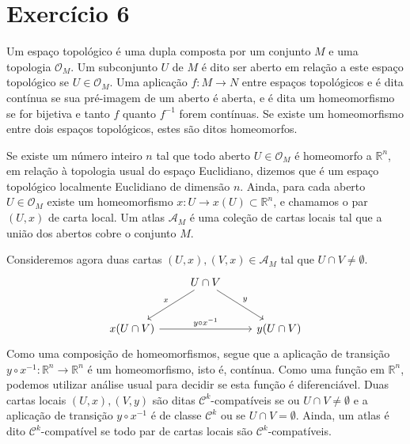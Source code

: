 \section*{Exercício 6}
Um espaço topológico é uma dupla  composta por um conjunto \(M\) e uma topologia \(\mathcal{O}_M\). Um subconjunto \(U\) de \(M\) é dito ser aberto em relação a este espaço topológico se \(U \in \mathcal{O}_M\). Uma aplicação \(f : M \to N\) entre espaços topológicos  e  é dita contínua se sua pré-imagem de um aberto é aberta, e é dita um homeomorfismo se for bijetiva e tanto \(f\) quanto \(f^{-1}\) forem contínuas. Se existe um homeomorfismo entre dois espaços topológicos, estes são ditos homeomorfos.

Se existe um número inteiro \(n\) tal que todo aberto \(U \in \mathcal{O}_M\) é homeomorfo a \(\mathbb{R}^n\), em relação à topologia usual do espaço Euclidiano, dizemos que  é um espaço topológico localmente Euclidiano de dimensão \(n\). Ainda, para cada aberto \(U \in \mathcal{O}_M\) existe um homeomorfismo \(x : U \to x(U) \subset \mathbb{R}^n\), e chamamos o par \((U,x)\) de carta local. Um atlas \(\mathscr{A}_M\) é uma coleção de cartas locais tal que a união dos abertos cobre o conjunto \(M\).

Consideremos agora duas cartas \((U, x), (V, x) \in \mathscr{A}_M\) tal que \(U \cap V \neq \emptyset\).
\begin{equation*}
    \begin{tikzcd}[column sep = normal, row sep = large]
        &\arrow[swap]{dl}{x} U \cap V\arrow{dr}{y}&\\
        x(U\cap V) \arrow{rr}{y \circ x^{-1}} & & y(U\cap V)
    \end{tikzcd}
\end{equation*}
Como uma composição de homeomorfismos, segue que a aplicação de transição \(y \circ x^{-1} : \mathbb{R}^n \to \mathbb{R}^n\) é um homeomorfismo, isto é, contínua. Como uma função em \(\mathbb{R}^n\), podemos utilizar análise usual para decidir se esta função é diferenciável. Duas cartas locais \((U, x), (V, y)\) são ditas \(\mathcal{C}^k\)-compatíveis se ou \(U \cap V \neq \emptyset\) e a aplicação de transição \(y \circ x^{-1}\) é de classe \(\mathcal{C}^k\) ou se \(U \cap V = \emptyset\). Ainda, um atlas é dito \(\mathcal{C}^k\)-compatível se todo par de cartas locais são \(\mathcal{C}^k\)-compatíveis.

